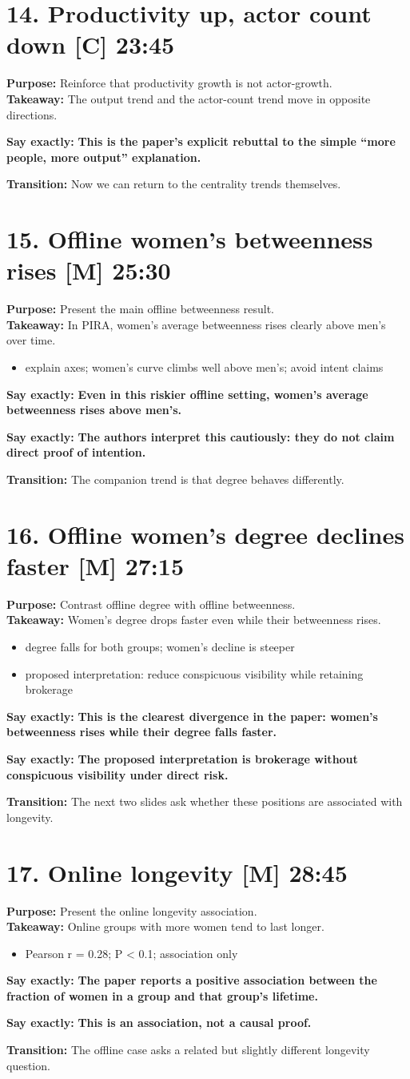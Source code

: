 \documentclass[11pt,a4paper]{article}
\newcommand{\slide}[4]{%
\section*{#1 \hfill {\normalsize #2}}
\textbf{Purpose:} #3\\
\textbf{Takeaway:} #4
}
\newcommand{\boldline}[1]{\par\textbf{Say exactly:} \textbf{#1}}
\newcommand{\transition}[1]{\par\textbf{Transition:} #1}
\newcommand{\labelbox}[1]{\textbf{[#1]}}
\begin{document}
\slide{14. Productivity up, actor count down \labelbox{C}}{23:45}{Reinforce that productivity growth is not actor-growth.}{The output trend and the actor-count trend move in opposite directions.}
\boldline{This is the paper’s explicit rebuttal to the simple “more people, more output” explanation.}
\transition{Now we can return to the centrality trends themselves.}

\slide{15. Offline women’s betweenness rises \labelbox{M}}{25:30}{Present the main offline betweenness result.}{In PIRA, women’s average betweenness rises clearly above men’s over time.}
\begin{itemize}
\item explain axes; women’s curve climbs well above men’s; avoid intent claims
\end{itemize}
\boldline{Even in this riskier offline setting, women’s average betweenness rises above men’s.}
\boldline{The authors interpret this cautiously: they do not claim direct proof of intention.}
\transition{The companion trend is that degree behaves differently.}

\slide{16. Offline women’s degree declines faster \labelbox{M}}{27:15}{Contrast offline degree with offline betweenness.}{Women’s degree drops faster even while their betweenness rises.}
\begin{itemize}
\item degree falls for both groups; women’s decline is steeper
\item proposed interpretation: reduce conspicuous visibility while retaining brokerage
\end{itemize}
\boldline{This is the clearest divergence in the paper: women’s betweenness rises while their degree falls faster.}
\boldline{The proposed interpretation is brokerage without conspicuous visibility under direct risk.}
\transition{The next two slides ask whether these positions are associated with longevity.}

\slide{17. Online longevity \labelbox{M}}{28:45}{Present the online longevity association.}{Online groups with more women tend to last longer.}
\begin{itemize}
\item Pearson r = 0.28; P < 0.1; association only
\end{itemize}
\boldline{The paper reports a positive association between the fraction of women in a group and that group’s lifetime.}
\boldline{This is an association, not a causal proof.}
\transition{The offline case asks a related but slightly different longevity question.}
\end{document}
